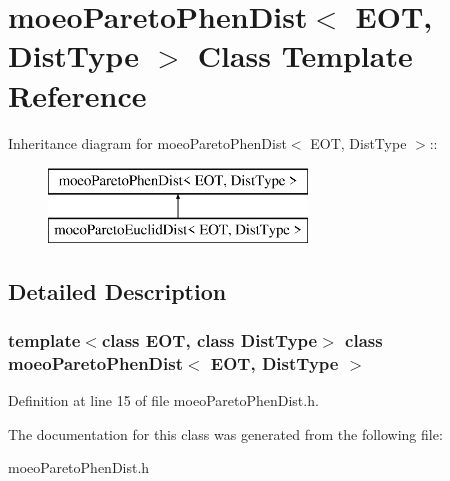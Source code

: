 \section{moeo\-Pareto\-Phen\-Dist$<$ EOT, Dist\-Type $>$ Class Template Reference}
\label{classmoeoParetoPhenDist}
Inheritance diagram for moeo\-Pareto\-Phen\-Dist$<$ EOT, Dist\-Type $>$::\begin{figure}[H]
\begin{center}
\leavevmode
\includegraphics[height=2cm]{classmoeoParetoPhenDist}
\end{center}
\end{figure}


\subsection{Detailed Description}
\subsubsection*{template$<$class EOT, class Dist\-Type$>$ class moeo\-Pareto\-Phen\-Dist$<$ EOT, Dist\-Type $>$}





Definition at line 15 of file moeo\-Pareto\-Phen\-Dist.h.

The documentation for this class was generated from the following file:\begin{CompactItemize}
\item 
moeo\-Pareto\-Phen\-Dist.h\end{CompactItemize}
